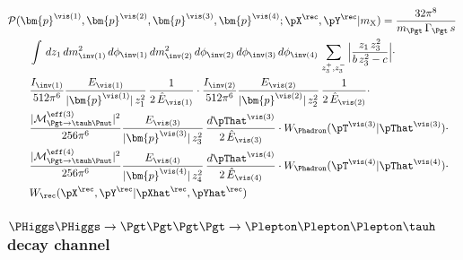 \begin{align}
&
\mathcal{P}(\bm{p}^{\vis(1)},\bm{p}^{\vis(2)},\bm{p}^{\vis(3)},\bm{p}^{\vis(4)};\pX^{\rec},\pY^{\rec}|m_{\textrm{X}})
= \frac{32\pi^{8}}{m_{\Pgt} \, \Gamma_{\Pgt} \, s} \, \nonumber \\
& \qquad \int \, dz_{1} \, dm^{2}_{\inv(1)} \, d\phi_{\inv(1)} \, dm^{2}_{\inv(2)}\, d\phi_{\inv(2)} \, d\phi_{\inv(3)} \, d\phi_{\inv(4)} \, 
  \sum_{z_{3}^{+},z_{3}^{-}} \, \Bigr\lvert \frac{z_{1} \, z_{3}^{2}}{b \, z_{3}^{2} - c} \Bigr\rvert \cdot \nonumber \\
& \qquad \frac{I_{\inv(1)}}{512\pi^{6}} 
  \frac{E_{\vis(1)}}{\vert\bm{p}^{\vis(1)}\vert \, z_{1}^{2}} \, \frac{1}{2 \, \hat{E}_{\vis(1)}}
  \cdot \frac{I_{\inv(2)}}{512\pi^{6}} 
  \frac{E_{\vis(2)}}{\vert\bm{p}^{\vis(2)}\vert \, z_{2}^{2}} \, \frac{1}{2 \, \hat{E}_{\vis(2)}} \cdot \nonumber \\
& \qquad \frac{\vert\mathcal{M}^{\eff(3)}_{\Pgt \to \tauh\Pnut}\vert^{2}}{256\pi^{6}} 
  \frac{E_{\vis(3)}}{\vert\bm{p}^{\vis(3)}\vert \, z_{3}^{2}} \, \frac{d\pThat^{\vis(3)}}{2 \, \hat{E}_{\vis(3)}} 
  \cdot W_{\Phadron}( \pT^{\vis(3)} | \pThat^{\vis(3)} ) \cdot \nonumber \\
& \qquad \frac{\vert\mathcal{M}^{\eff(4)}_{\Pgt \to \tauh\Pnut}\vert^{2}}{256\pi^{6}} 
  \frac{E_{\vis(4)}}{\vert\bm{p}^{\vis(4)}\vert \, z_{4}^{2}} \, \frac{d\pThat^{\vis(4)}}{2 \, \hat{E}_{\vis(4)}} 
  \cdot W_{\Phadron}( \pT^{\vis(4)} | \pThat^{\vis(4)} ) \cdot \nonumber \\
& \qquad W_{\rec}( \pX^{\rec},\pY^{\rec} | \pXhat^{\rec},\pYhat^{\rec} ) 
\label{eq:likelihood_llthth}
\end{align}

\subsubsection{$\PHiggs\PHiggs \to \Pgt\Pgt\Pgt\Pgt \to \Plepton\Plepton\Plepton\tauh$ decay channel}

